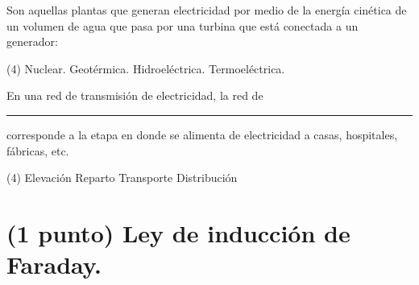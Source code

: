 \documentclass[12pt, letter]{exam}
\begin{document}
\begin{questions}
    \question Son aquellas plantas que generan electricidad por medio de la energía cinética de un volumen de agua que pasa por una turbina que está conectada a un generador:
    \begin{tasks}(4)
        \task Nuclear.
        \task Geotérmica.
        \task Hidroeléctrica.
        \task Termoeléctrica.
    \end{tasks}
    \question En una red de transmisión de electricidad, la red de \rule{2cm}{0.1mm} corresponde a la etapa en donde se alimenta de electricidad a casas, hospitales, fábricas, etc.
    \begin{tasks}(4)
        \task Elevación
        \task Reparto
        \task Transporte
        \task Distribución
    \end{tasks}



    \section{(1 punto) Ley de inducción de Faraday.}


\end{questions}
\end{document}

